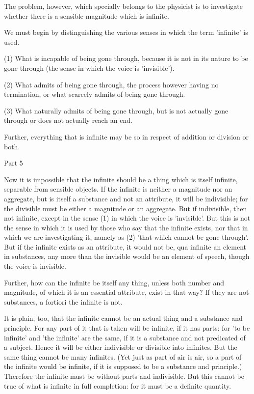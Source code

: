 The problem, however, which specially belongs to the physicist is
to investigate whether there is a sensible magnitude which is infinite.

We must begin by distinguishing the various senses in which the term
'infinite' is used. 

(1) What is incapable of being gone through, because it is not in
its nature to be gone through (the sense in which the voice is 'invisible').

(2) What admits of being gone through, the process however having
no termination, or what scarcely admits of being gone through.

(3) What naturally admits of being gone through, but is not actually
gone through or does not actually reach an end. 

Further, everything that is infinite may be so in respect of addition
or division or both. 

Part 5

Now it is impossible that the infinite should be a thing which is
itself infinite, separable from sensible objects. If the infinite
is neither a magnitude nor an aggregate, but is itself a substance
and not an attribute, it will be indivisible; for the divisible must
be either a magnitude or an aggregate. But if indivisible, then not
infinite, except in the sense (1) in which the voice is 'invisible'.
But this is not the sense in which it is used by those who say that
the infinite exists, nor that in which we are investigating it, namely
as (2) 'that which cannot be gone through'. But if the infinite exists
as an attribute, it would not be, qua infinite an element in substances,
any more than the invisible would be an element of speech, though
the voice is invisible. 

Further, how can the infinite be itself any thing, unless both number
and magnitude, of which it is an essential attribute, exist in that
way? If they are not substances, a fortiori the infinite is not.

It is plain, too, that the infinite cannot be an actual thing and
a substance and principle. For any part of it that is taken will be
infinite, if it has parts: for 'to be infinite' and 'the infinite'
are the same, if it is a substance and not predicated of a subject.
Hence it will be either indivisible or divisible into infinites. But
the same thing cannot be many infinites. (Yet just as part of air
is air, so a part of the infinite would be infinite, if it is supposed
to be a substance and principle.) Therefore the infinite must be without
parts and indivisible. But this cannot be true of what is infinite
in full completion: for it must be a definite quantity. 

